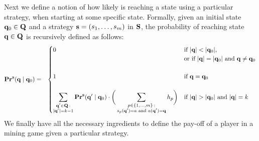 \documentclass{article}
\begin{document}
Next we define a notion of how likely is reaching a state using a particular strategy, when starting at some specific state. Formally, given an initial state $\mathbf{q}_0 \in \mathbf{Q}$ and a strategy $\mathbf{s} = (s_1, \ldots, s_m)$ in $\mathbf{S}$, 
the probability of reaching state $\mathbf{q} \in \mathbf{Q}$ is recursively defined as follows:
\begin{eqnarray*}
\mathbf{Pr}^{\mathbf{s}}(\mathbf{q} \mid \mathbf{q}_0) & = &
\begin{cases}
0 & \text{if } |\mathbf{q}| < |\mathbf{q}_0|,\\
& \text{or if }  |\mathbf{q}| = |\mathbf{q}_0| \text{ and } \mathbf{q} \neq \mathbf{q}_0\\
&\\
1 & \text{if } \mathbf{q} =  \mathbf{q}_0\\
& \\
{\displaystyle \sum_{\substack{\mathbf{q}' \in \mathbf{Q} \,:\\ |\mathbf{q}'| = k-1}} \mathbf{Pr}^{\mathbf{s}}(\mathbf{q}' \mid \mathbf{q}_0) \cdot \bigg(\sum_{\substack{p \in \{1, \ldots, m\} \,: \\ s_p(\mathbf{q}') = a \text{ and } a(\mathbf{q}') = \mathbf{q}}} h_p\bigg)}
 & \text{if } |\mathbf{q}| > |\mathbf{q}_0| \text{ and } |\mathbf{q}| = k
\end{cases}
\end{eqnarray*}
We finally have all the necessary ingredients to define the pay-off of a player in a mining game given a particular strategy.
\end{document}
